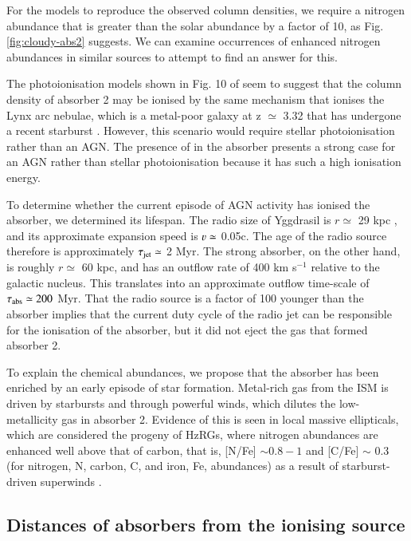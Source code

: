 For the  models to reproduce the observed column densities, we require a nitrogen abundance that is greater than the solar abundance by a factor of 10, as Fig. \ref{fig:cloudy-abs2} suggests. We can examine occurrences of enhanced nitrogen abundances in similar sources to attempt to find an answer for this. 

The photoionisation models shown in Fig. 10 of \citet{binette2006} seem to suggest that the  column density of absorber 2 may be ionised by the same mechanism that ionises the Lynx arc nebulae, which is a metal-poor  galaxy at z $\simeq$ 3.32 that has undergone a recent starburst \citep{villar-martin2004}. However, this scenario would require stellar photoionisation rather than an AGN. The presence of  in the absorber presents a strong case for an AGN rather than stellar photoionisation because it has such a high ionisation energy. 

To determine whether the current episode of AGN activity has ionised the absorber, we determined its lifespan. The radio size of Yggdrasil is $r \simeq$ 29 kpc \citep{pentericci1999}, and its approximate expansion speed is $\varv \simeq$ 0.05c. The age of the radio source therefore is approximately $\tau_{\rm jet} \simeq$ 2 Myr. The strong absorber, on the other hand, is roughly $r \simeq$ 60 kpc, and has an outflow rate of 400 km s$^{-1}$ relative to the galactic nucleus. This translates into an approximate outflow time-scale of $\tau_{\rm abs} \simeq 200$ Myr. That the radio source is a factor of 100 younger than the absorber implies that the current duty cycle of the radio jet can be responsible for the ionisation of the absorber, but it did not eject the gas that formed absorber 2. 

To explain the chemical abundances, we propose that the absorber has been enriched by an early episode of star formation. Metal-rich gas from the ISM is driven by starbursts and through powerful winds, which dilutes the low-metallicity gas in absorber 2. Evidence of this is seen in local massive ellipticals, which are considered the progeny of HzRGs, where nitrogen abundances are enhanced well above that of carbon, that is, [N/Fe] $\sim 0.8-1$ and [C/Fe] $\sim$ 0.3 (for nitrogen, N, carbon, C, and iron, Fe, abundances) as a result of starburst-driven superwinds \citep{greene2013,greene2015}. 

\subsection{Distances of absorbers from the ionising source}

